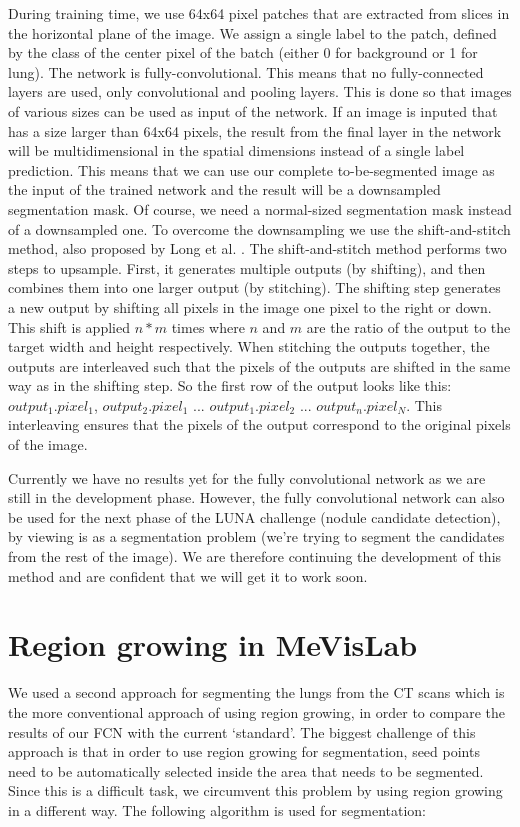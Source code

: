 \documentclass[a4paper,10pt]{article}
\numberwithin{equation}{section} %
\numberwithin{figure}{section} %
\numberwithin{table}{section} %
\begin{document}
During training time, we use 64x64 pixel patches that are extracted from slices in the horizontal plane of the image.
We assign a single label to the patch, defined by the class of the center pixel of the batch (either 0 for background or 1 for lung).
The network is fully-convolutional. This means that no fully-connected layers are used, only convolutional and pooling layers.
This is done so that images of various sizes can be used as input of the network.
If an image is inputed that has a size larger than 64x64 pixels, the result from the final layer in the network will be multidimensional in the spatial dimensions instead of a single label prediction.
This means that we can use our complete to-be-segmented image as the input of the trained network and the result will be a downsampled segmentation mask.
Of course, we need a normal-sized segmentation mask instead of a downsampled one.
To overcome the downsampling we use the shift-and-stitch method, also proposed by Long et al. \cite{long2015fully}. The shift-and-stitch method performs two steps to upsample. First, it generates multiple outputs (by shifting), and then combines them into one larger output (by stitching). The shifting step generates a new output by shifting all pixels in the image one pixel to the right or down. This shift is applied $n*m$ times where $n$ and $m$ are the ratio of the output to the target width and height respectively.
When stitching the outputs together, the outputs are interleaved such that the pixels of the outputs are shifted in the same way as in the shifting step. So the first row of the output looks like this: $output_1.pixel_1$, $output_2.pixel_1$ ... $output_1.pixel_2$ ... $output_n.pixel_N$. This interleaving ensures that the pixels of the output correspond to the original pixels of the image.

Currently we have no results yet for the fully convolutional network as we are still in the development phase. However, the fully convolutional network can also be used for the next phase of the LUNA challenge (nodule candidate detection), by viewing is as a segmentation problem (we're trying to segment the candidates from the rest of the image). We are therefore continuing the development of this method and are confident that we will get it to work soon.

\section{Region growing in MeVisLab}
We used a second approach for segmenting the lungs from the CT scans which is the more conventional approach of using region growing, in order to compare the results of our FCN with the current `standard'. The biggest challenge of this approach is that in order to use region growing for segmentation, seed points need to be automatically selected inside the area that needs to be segmented. Since this is a difficult task, we circumvent this problem by using region growing in a different way. The following algorithm is used for segmentation:
\end{document}
